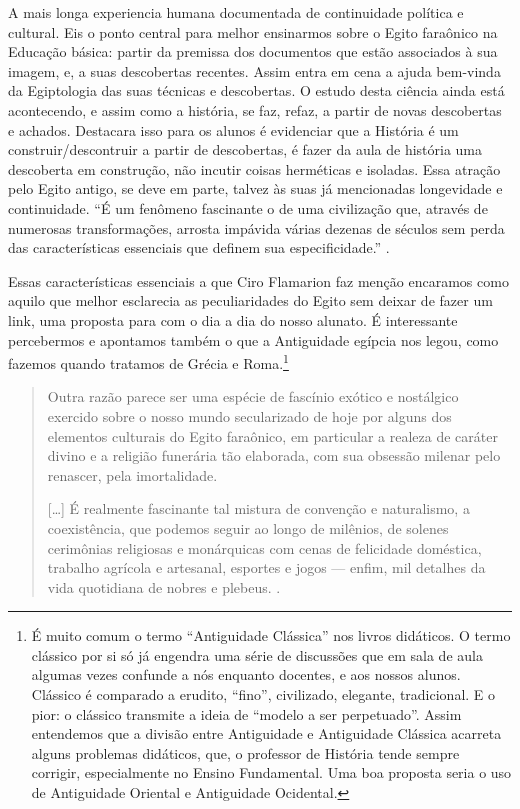 \begin{refsection}
    A mais longa experiencia humana documentada de continuidade política e cultural. Eis o ponto central para melhor ensinarmos sobre o Egito faraônico na Educação básica: partir da premissa dos documentos que estão associados à sua imagem, e, a suas descobertas recentes. Assim entra em cena a ajuda bem-vinda da Egiptologia das suas técnicas e descobertas. O estudo desta ciência ainda está acontecendo, e assim como a história, se faz, refaz, a partir de novas descobertas e achados. Destacara isso para os alunos é evidenciar que a História é um construir/descontruir a partir de descobertas, é fazer da aula de história uma descoberta em construção, não incutir coisas herméticas e isoladas.  Essa atração pelo Egito antigo, se deve em parte, talvez às suas já mencionadas longevidade e continuidade. ``É um fenômeno fascinante o de uma civilização que, através de numerosas transformações, arrosta impávida várias dezenas de séculos sem perda das características essenciais que definem sua especificidade.'' \cite[p.~8]{Cardoso2004Egito}.

    Essas características essenciais a que Ciro Flamarion faz menção encaramos como aquilo que melhor esclarecia as peculiaridades do Egito sem deixar de fazer um link, uma proposta para com o dia a dia do nosso alunato. É interessante percebermos e apontamos também o que a Antiguidade egípcia nos legou, como fazemos quando tratamos de Grécia e Roma.\footnote{É muito comum o termo ``Antiguidade Clássica'' nos livros didáticos. O termo clássico por si só já engendra uma série de discussões que em sala de aula algumas vezes confunde a nós enquanto docentes, e aos nossos alunos. Clássico é comparado a erudito, ``fino'', civilizado, elegante, tradicional. E o pior: o clássico transmite a ideia de ``modelo a ser perpetuado''. Assim entendemos que a divisão entre Antiguidade e Antiguidade Clássica acarreta alguns problemas didáticos, que, o professor de História tende sempre corrigir, especialmente no Ensino Fundamental. Uma boa proposta seria o uso de Antiguidade Oriental e Antiguidade Ocidental.}

    \begin{quotation}
        Outra razão parece ser uma espécie de fascínio exótico e nostálgico exercido sobre o nosso mundo secularizado de hoje por alguns dos elementos culturais do Egito faraônico, em particular a realeza de caráter divino e a religião funerária tão elaborada, com sua obsessão milenar pelo renascer, pela imortalidade. 

        [\dots] É realmente fascinante tal mistura de convenção e naturalismo, a coexistência, que podemos seguir ao longo de milênios, de solenes cerimônias religiosas e monárquicas com cenas de felicidade doméstica, trabalho agrícola e artesanal, esportes e jogos --- enfim, mil detalhes da vida quotidiana de nobres e plebeus. \cite[p.~8]{Cardoso2004Egito}.
    \end{quotation}


\end{refsection}
